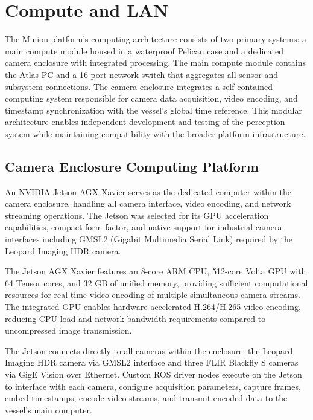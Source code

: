 \section{Compute and LAN} \label{compute_lan}

The Minion platform's computing architecture consists of two primary systems: a main compute module housed in a waterproof Pelican case and a dedicated camera enclosure with integrated processing. The main compute module contains the Atlas PC and a 16-port network switch that aggregates all sensor and subsystem connections. The camera enclosure integrates a self-contained computing system responsible for camera data acquisition, video encoding, and timestamp synchronization with the vessel's global time reference. This modular architecture enables independent development and testing of the perception system while maintaining compatibility with the broader platform infrastructure.

\subsection{Camera Enclosure Computing Platform} \label{jetson_platform}

An NVIDIA Jetson AGX Xavier serves as the dedicated computer within the camera enclosure, handling all camera interface, video encoding, and network streaming operations. The Jetson was selected for its GPU acceleration capabilities, compact form factor, and native support for industrial camera interfaces including GMSL2 (Gigabit Multimedia Serial Link) required by the Leopard Imaging HDR camera.

The Jetson AGX Xavier features an 8-core ARM CPU, 512-core Volta GPU with 64 Tensor cores, and 32 GB of unified memory, providing sufficient computational resources for real-time video encoding of multiple simultaneous camera streams. The integrated GPU enables hardware-accelerated H.264/H.265 video encoding, reducing CPU load and network bandwidth requirements compared to uncompressed image transmission.

The Jetson connects directly to all cameras within the enclosure: the Leopard Imaging HDR camera via GMSL2 interface and three FLIR Blackfly S cameras via GigE Vision over Ethernet. Custom \ac{ROS} driver nodes execute on the Jetson to interface with each camera, configure acquisition parameters, capture frames, embed timestamps, encode video streams, and transmit encoded data to the vessel's main computer.


